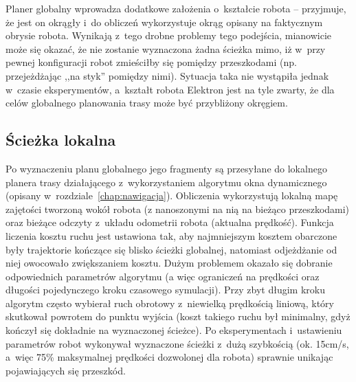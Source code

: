 Planer globalny wprowadza dodatkowe założenia o~kształcie robota -- przyjmuje, że
jest on okrągły i~do obliczeń wykorzystuje okrąg opisany na faktycznym obrysie robota.
Wynikają z~tego drobne problemy tego podejścia, mianowicie może się okazać, że nie
zostanie wyznaczona żadna ścieżka mimo, iż w~przy pewnej konfiguracji robot zmieściłby
się pomiędzy przeszkodami (np. przejeżdżając ,,na styk'' pomiędzy nimi). Sytuacja
taka nie wystąpiła jednak w~czasie eksperymentów, a~kształt robota Elektron jest
na tyle zwarty, że dla celów globalnego planowania trasy może być przybliżony okręgiem.

\subsection{Ścieżka lokalna}

Po wyznaczeniu planu globalnego jego fragmenty są przesyłane do lokalnego planera
trasy działającego z~wykorzystaniem algorytmu okna dynamicznego (opisany 
w~rozdziale~\ref{chap:nawigacja}). Obliczenia wykorzystują lokalną mapę zajętości
tworzoną wokół robota (z nanoszonymi na nią na bieżąco przeszkodami) oraz
bieżące odczyty z~układu odometrii robota (aktualna prędkość).
Funkcja liczenia kosztu ruchu jest ustawiona tak,
aby najmniejszym kosztem obarczone były trajektorie kończące się blisko ścieżki globalnej,
natomiast odjeżdżanie od niej owocowało zwiększaniem kosztu. Dużym problemem okazało
się dobranie odpowiednich parametrów algorytmu (a więc ograniczeń na prędkości
oraz długości pojedynczego kroku czasowego symulacji). Przy zbyt długim kroku
algorytm często wybierał ruch obrotowy z~niewielką prędkością liniową, który skutkował
powrotem do punktu wyjścia (koszt takiego ruchu był minimalny, gdyż kończył się dokładnie
na wyznaczonej ścieżce). Po eksperymentach i~ustawieniu parametrów robot wykonywał
wyznaczone ścieżki z~dużą szybkością (ok. 15cm/s, a~więc 75\% maksymalnej prędkości
dozwolonej dla robota) sprawnie unikając pojawiających się przeszkód.
